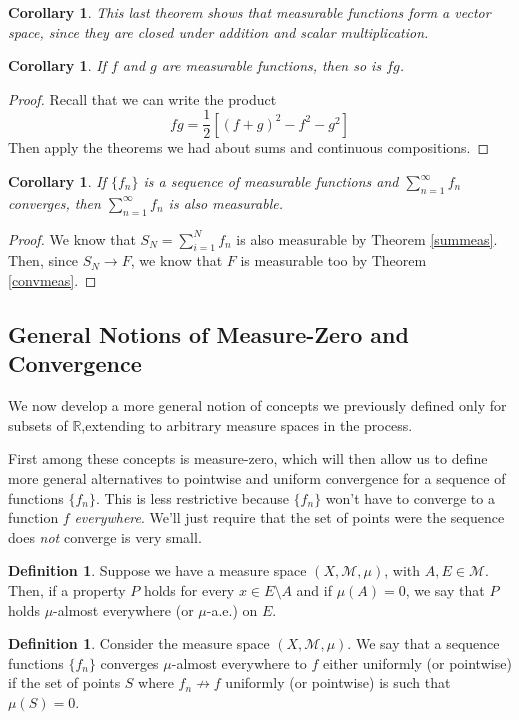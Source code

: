 \documentclass[12pt]{article}
\theoremstyle{plain}
\newtheorem{cor}[thm]{Corollary}
\theoremstyle{definition}
\newtheorem{defn}[thm]{Definition}
\theoremstyle{remark}
\begin{document}
\begin{cor}
This last theorem shows that measurable functions form a \emph{vector space}, since they are closed under addition and scalar multiplication.
\end{cor}

\begin{cor}
If $f$ and $g$ are measurable functions, then so is $fg$.
\end{cor}
\begin{proof}
Recall that we can write the product
\[ 
    fg = \frac{1}{2}\left[(f+g)^2 - f^2 - g^2\right]
\]
Then apply the theorems we had about sums and continuous compositions.
\end{proof}

\begin{cor}
If $\{f_n\}$ is a sequence of measurable functions and $\sum^\infty_{n=1} f_n$ converges, then $\sum^\infty_{n=1} f_n$ is also measurable. 
\end{cor}
\begin{proof}
We know that $S_N = \sum^N_{i=1} f_n$ is also measurable by Theorem \ref{summeas}. Then, since $S_N\rightarrow F$, we know that $F$ is measurable too by Theorem \ref{convmeas}.
\end{proof}


\subsection{General Notions of Measure-Zero and Convergence}

We now develop a more general notion of concepts we previously defined only for subsets of $\mathbb{R}$,extending to arbitrary measure spaces in the process.

First among these concepts is measure-zero, which will then allow us to define more general alternatives to pointwise and uniform convergence for a sequence of functions $\{f_n\}$.  This is less restrictive because $\{f_n\}$ won't have to converge to a function $f$ \emph{everywhere}. We'll just require that the set of points were the sequence does \emph{not} converge is very small.

\begin{defn}
Suppose we have a measure space $(X,\mathscr{M},\mu)$, with $A, E\in\mathscr{M}$. Then, if a property $P$ holds for every $x\in E\setminus A$ and if $\mu(A)=0$, we say that $P$ holds $\mu$-almost everywhere (or $\mu$-a.e.) on $E$.
\end{defn}


\begin{defn}
Consider the measure space $(X,\mathscr{M},\mu)$. We say that a sequence functions $\{f_n\}$ converges $\mu$-almost everywhere to $f$ either uniformly (or pointwise) if the set of points $S$ where $f_n \not\rightarrow f$ uniformly (or pointwise) is such that $\mu(S) = 0$.
\end{defn}
\end{document}
